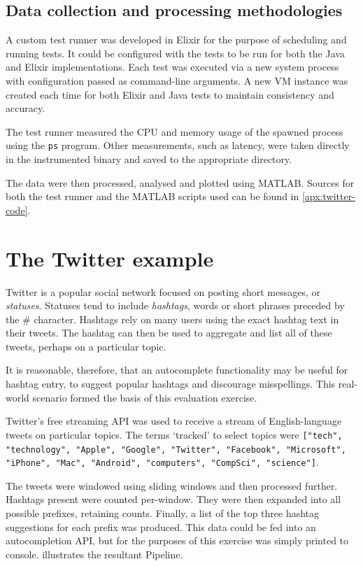\subsection{Data collection and processing methodologies}\label{sec:eval:approach:collection}

A custom test runner was developed in Elixir for the purpose of scheduling and running tests.
It could be configured with the tests to be run for both the Java and Elixir implementations.
Each test was executed via a new system process with configuration passed as command-line arguments.
A new VM instance was created each time for both Elixir and Java tests to maintain consistency and accuracy.

The test runner measured the CPU and memory usage of the spawned process using the \verb|ps| program.
Other measurements, such as latency, were taken directly in the instrumented binary and saved to the appropriate directory.

The data were then processed, analysed and plotted using MATLAB.
Sources for both the test runner and the MATLAB scripts used can be found in \cref{apx:twitter-code}.

\section{The Twitter example}\label{sec:eval:approach:twitter}

Twitter is a popular social network focused on posting short messages, or \emph{statuses}.
Statuses tend to include \emph{hashtags}, words or short phrases preceded by the \# character.
Hashtags rely on many users using the exact hashtag text in their tweets.
The hashtag can then be used to aggregate and list all of these tweets, perhaps on a particular topic.

It is reasonable, therefore, that an autocomplete functionality may be useful for hashtag entry, to suggest popular hashtags and discourage misspellings.
This real-world scenario formed the basis of this evaluation exercise.

Twitter's free streaming API \cite{TwitterStreamingAPI} was used to receive a stream of English-language tweets on particular topics.
The terms `tracked' to select topics were \texttt{["tech", "technology", "Apple", "Google", "Twitter", "Facebook", "Microsoft", "iPhone", "Mac", "Android", "computers", "CompSci", "science"]}.

The tweets were windowed using sliding windows and then processed further.
Hashtags present were counted per-window.
They were then expanded into all possible prefixes, retaining counts.
Finally, a list of the top three hashtag suggestions for each prefix was produced.
This data could be fed into an autocompletion API, but for the purposes of this exercise was simply printed to console.
 illustrates the resultant Pipeline.

